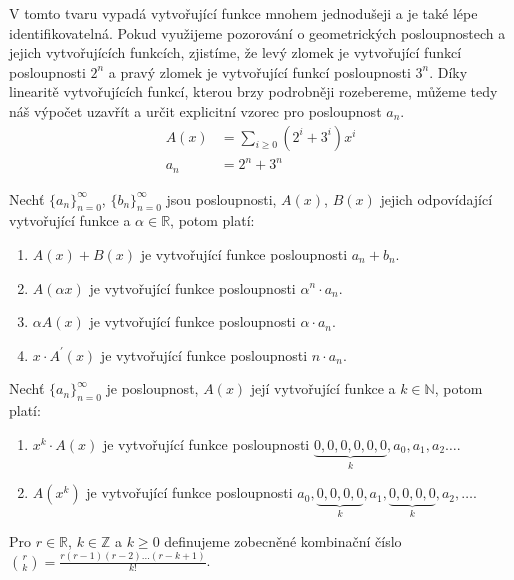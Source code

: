\begin{t_example}
  V tomto tvaru vypadá vytvořující funkce mnohem jednodušeji a je také lépe identifikovatelná. Pokud využijeme pozorování o geometrických posloupnostech a jejich vytvořujících funkcích, zjistíme, že levý zlomek je vytvořující funkcí posloupnosti $2^n$ a pravý zlomek je vytvořující funkcí posloupnosti $3^n$. Díky linearitě vytvořujících funkcí, kterou brzy podrobněji rozebereme, můžeme tedy náš výpočet uzavřít a určit explicitní vzorec pro posloupnost $a_n$.
  \begin{align*}
    A(x) &= \sum_{i\geq 0}(2^i+3^i)x^i\\
    a_n&=2^n+3^n
  \end{align*}
\end{t_example}

\begin{t_fact}
  Nechť $\{a_n\}_{n=0}^\infty$, $\{b_n\}_{n=0}^\infty$ jsou posloupnosti, $A(x)$, $B(x)$ jejich odpovídající vytvořující funkce a $\alpha\in\mathbb{R}$, potom platí:
  \begin{enumerate}
    \item $A(x)+B(x)$ je vytvořující funkce posloupnosti $a_n+b_n$.
    \item $A(\alpha x)$ je vytvořující funkce posloupnosti $\alpha^n\cdot a_n$.
    \item $\alpha A(x)$ je vytvořující funkce posloupnosti $\alpha\cdot a_n$.
    \item $x\cdot A^\prime(x)$ je vytvořující funkce posloupnosti $n\cdot a_n$.
  \end{enumerate}   
 \end{t_fact}
 
\begin{t_fact}
  Nechť $\{a_n\}_{n=0}^\infty$ je posloupnost, $A(x)$ její vytvořující funkce a $k \in\mathbb{N}$, potom platí:
  \begin{enumerate}
    \item $x^k\cdot A(x)$ je vytvořující funkce posloupnosti $\underbrace{0, 0, 0, 0, 0, 0}_{k}, a_0, a_1, a_2\dots$.
    \item $A(x^k)$ je vytvořující funkce posloupnosti $a_0, \underbrace{0, 0, 0, 0}_{k}, a_1, \underbrace{0, 0, 0, 0}_{k}, a_2,\dots$.
  \end{enumerate}
\end{t_fact}

\begin{t_definition}
  Pro $r\in\mathbb{R}$, $k\in\mathbb{Z}$ a $k\geq 0$ definujeme zobecněné kombinační číslo $\binom{r}{k}=\frac{r(r-1)(r-2)\dots (r-k+1)}{k!}$.
\end{t_definition}

